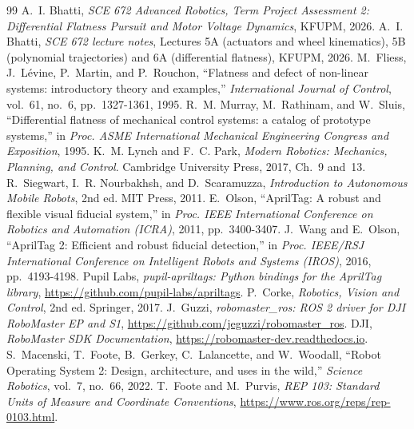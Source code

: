 \clearpage
{}
\begingroup\small
\renewcommand{\section}[2]{}%
\begin{thebibliography}{99}\setlength{\itemsep}{3pt}
 A.~I. Bhatti, \emph{SCE 672 Advanced Robotics, Term Project Assessment 2: Differential Flatness
  Pursuit and Motor Voltage Dynamics}, KFUPM, 2026.
 A.~I. Bhatti, \emph{SCE 672 lecture notes}, Lectures 5A (actuators and wheel kinematics),
  5B (polynomial trajectories) and 6A (differential flatness), KFUPM, 2026.
 M.~Fliess, J.~L\'evine, P.~Martin, and P.~Rouchon, ``Flatness and defect of non-linear systems:
  introductory theory and examples,'' \emph{International Journal of Control}, vol.~61, no.~6, pp.~1327-1361, 1995.
 R.~M. Murray, M.~Rathinam, and W.~Sluis, ``Differential flatness of mechanical control systems: a
  catalog of prototype systems,'' in \emph{Proc. ASME International Mechanical Engineering Congress and Exposition}, 1995.
 K.~M. Lynch and F.~C. Park, \emph{Modern Robotics: Mechanics, Planning, and Control}. Cambridge
  University Press, 2017, Ch.~9 and~13.
 R.~Siegwart, I.~R. Nourbakhsh, and D.~Scaramuzza, \emph{Introduction to Autonomous Mobile Robots},
  2nd ed. MIT Press, 2011.
 E.~Olson, ``AprilTag: A robust and flexible visual fiducial system,'' in \emph{Proc. IEEE International
  Conference on Robotics and Automation (ICRA)}, 2011, pp.~3400-3407.
 J.~Wang and E.~Olson, ``AprilTag 2: Efficient and robust fiducial detection,'' in \emph{Proc. IEEE/RSJ
  International Conference on Intelligent Robots and Systems (IROS)}, 2016, pp.~4193-4198.
 Pupil Labs, \emph{pupil-apriltags: Python bindings for the AprilTag library},
  \url{https://github.com/pupil-labs/apriltags}.
 P.~Corke, \emph{Robotics, Vision and Control}, 2nd ed. Springer, 2017.
 J.~Guzzi, \emph{robomaster\_ros: ROS 2 driver for DJI RoboMaster EP and S1},
  \url{https://github.com/jeguzzi/robomaster_ros}.
 DJI, \emph{RoboMaster SDK Documentation}, \url{https://robomaster-dev.readthedocs.io}.
 S.~Macenski, T.~Foote, B.~Gerkey, C.~Lalancette, and W.~Woodall, ``Robot Operating System 2: Design,
  architecture, and uses in the wild,'' \emph{Science Robotics}, vol.~7, no.~66, 2022.
 T.~Foote and M.~Purvis, \emph{REP 103: Standard Units of Measure and Coordinate Conventions},
  \url{https://www.ros.org/reps/rep-0103.html}.
\end{thebibliography}
\endgroup

